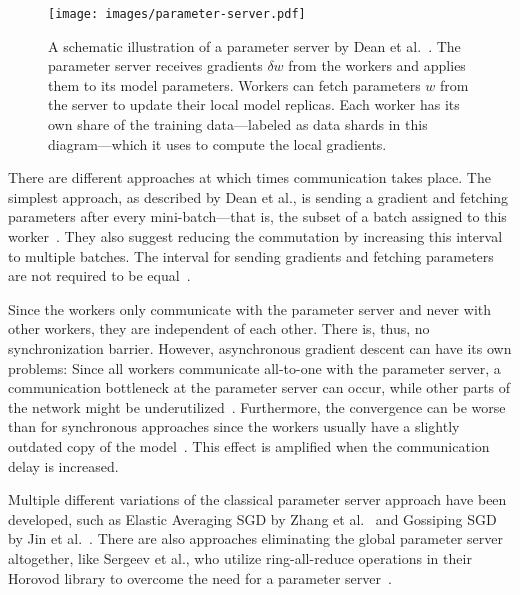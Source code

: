 \documentclass[conference]{IEEEtran}
\begin{document}
\begin{figure}[ht]
\centering
\texttt{[image: images/parameter-server.pdf]}
\caption{
A schematic illustration of a parameter server by Dean et al.~\cite{dean2012-Large-scale-distributed}.
The parameter server receives gradients $\delta w$ from the workers and applies them to its model parameters.
Workers can fetch parameters $w$ from the server to update their local model replicas.
Each worker has its own share of the training data---labeled as data shards in this diagram---which it uses to compute the local gradients.
}
\label{fig:parameter_server}
\end{figure}

There are different approaches at which times communication takes place.
The simplest approach, as described by Dean et al., is sending a gradient and fetching parameters after every mini-batch---that is, the subset of a batch assigned to this worker~\cite{dean2012-Large-scale-distributed}.
They also suggest reducing the commutation by increasing this interval to multiple batches.
The interval for sending gradients and fetching parameters are not required to be equal~\cite{dean2012-Large-scale-distributed}.

Since the workers only communicate with the parameter server and never with other workers, they are independent of each other.
There is, thus, no synchronization barrier.
However, asynchronous gradient descent can have its own problems:
Since all workers communicate all-to-one with the parameter server, a communication bottleneck at the parameter server can occur, while other parts of the network might be underutilized~\cite{jin2016-How-to-scale}.
Furthermore, the convergence can be worse than for synchronous approaches since the workers usually have a slightly outdated copy of the model~\cite{jin2016-How-to-scale,chen2016-Revisiting-distributed-synchronous-SGD}.
This effect is amplified when the communication delay is increased.

Multiple different variations of the classical parameter server approach have been developed, such as Elastic Averaging SGD by Zhang et al.~\cite{zhang2015-Elastic-AvgSGD} and Gossiping SGD by Jin et al.~\cite{jin2016-How-to-scale}.
There are also approaches eliminating the global parameter server altogether, like Sergeev et al., who utilize ring-all-reduce operations in their Horovod library to overcome the need for a parameter server~\cite{sergeev2018horovod}.

\end{document}
